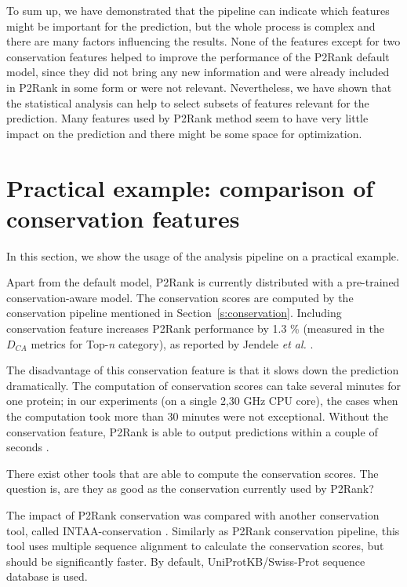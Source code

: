 To sum up, we have demonstrated that the pipeline can indicate which features might be important for the prediction, but the whole process is complex and there are many factors influencing the results. None of the features except for two conservation features helped to improve the performance of the P2Rank default model, since they did not bring any new information and were already included in P2Rank in some form or were not relevant. Nevertheless, we have shown that the statistical analysis can help to select subsets of features relevant for the prediction. Many features used by P2Rank method seem to have very little impact on the prediction and there might be some space for optimization.


\newpage
\section{Practical example: comparison of \newline conservation features}

In this section, we show the usage of the analysis pipeline on a practical example.

Apart from the default model, P2Rank is currently distributed with a pre-trained conservation-aware model. The conservation scores are computed by the conservation pipeline mentioned in Section~\ref{s:conservation}. Including conservation feature increases P2Rank performance by 1.3 \% (measured in the $D_{CA}$ metrics for Top-\textit{n} category), as reported by Jendele \textit{et al.} \cite{prankweb}.

The disadvantage of this conservation feature is that it slows down the prediction dramatically. The computation of conservation scores can take several minutes for one protein; in our experiments (on a single 2,30 GHz CPU core), the cases when the computation took more than 30 minutes were not exceptional. Without the conservation feature, P2Rank is able to output predictions within a couple of seconds \cite{p2rank1}.

There exist other tools that are able to compute the conservation scores. The question is, are they as good as the conservation currently used by P2Rank?

The impact of P2Rank conservation was compared with another conservation tool, called INTAA-conservation \cite{intaa_github}. Similarly as P2Rank conservation pipeline, this tool uses multiple sequence alignment to calculate the conservation scores, but should be significantly faster. By default, UniProtKB/Swiss-Prot sequence database \cite{swissprot} is used.

